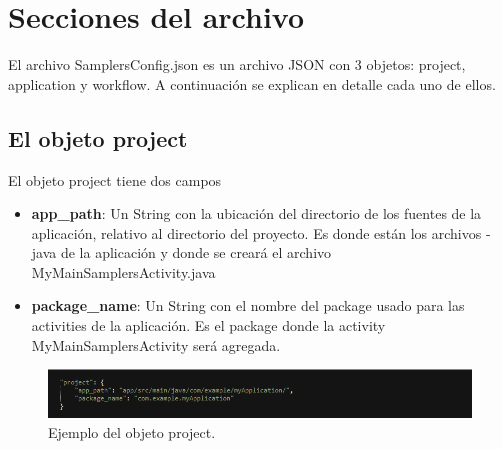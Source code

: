\section{Secciones del archivo} \label{sec:archivo_config_detallado}

El archivo SamplersConfig.json es un archivo JSON con 3 objetos: project, application y workflow. A continuación se explican en detalle cada uno de ellos.

\subsection{El objeto project}
		
	El objeto project tiene dos campos
	\begin{itemize}
		\item \textbf{app\_path}: Un String con la ubicación del directorio de los fuentes de la aplicación, relativo al directorio del proyecto. Es donde están los archivos -java de la aplicación y donde se creará el archivo MyMainSamplersActivity.java
		\item \textbf{package\_name}: Un String con el nombre del package usado para las activities de la aplicación. Es el package donde la activity MyMainSamplersActivity será agregada.
	\end{itemize}
	
\begin{figure}[H]
  \centering
    \includegraphics[scale=0.6]{50-anexos/B-uso/json_project.png} 
    \caption{Ejemplo del objeto project.}
\end{figure}	
	
